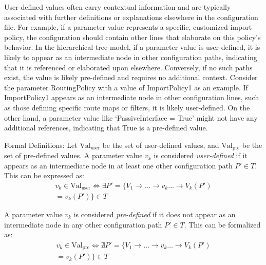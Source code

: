 User-defined values often carry contextual information and are typically associated with further definitions or explanations elsewhere in the configuration file. For example, if a parameter value represents a specific, customized import policy, the configuration should contain other lines that elaborate on this policy's behavior. In the hierarchical tree model, if a parameter value is user-defined, it is likely to appear as an intermediate node in other configuration paths, indicating that it is referenced or elaborated upon elsewhere. Conversely, if no such paths exist, the value is likely pre-defined and requires no additional context. Consider the parameter RoutingPolicy with a value of ImportPolicy1 as an example. If ImportPolicy1 appears as an intermediate node in other configuration lines, such as those defining specific route maps or filters, it is likely user-defined. On the other hand, a parameter value like `PassiveInterface = True' might not have any additional references, indicating that True is a pre-defined value.

Formal Definitions:
Let \( \text{Val}_{\text{user}} \) be the set of user-defined values, and \( \text{Val}_{\text{pre}} \) be the set of pre-defined values.
A parameter value \( v_k \) is considered \textit{user-defined} if it appears as an intermediate node in at least one other configuration path \( P' \in T \). This can be expressed as:
\begin{multline*}
v_k \in \text{Val}_{\text{user}} \iff \exists P' = \{ V_1 \rightarrow \dots \rightarrow v_k \dots \rightarrow V_k(P') \\ = v_k(P') \} \in T
\end{multline*}

A parameter value \( v_k \) is considered \textit{pre-defined} if it does not appear as an intermediate node in any other configuration path \( P' \in T \). This can be formalized as:
\begin{multline*}
v_k \in \text{Val}_{\text{pre}} \iff \nexists P' = \{ V_1 \rightarrow \dots \rightarrow v_k \dots \rightarrow V_k(P') \\ = v_k(P') \} \in T
\end{multline*}




